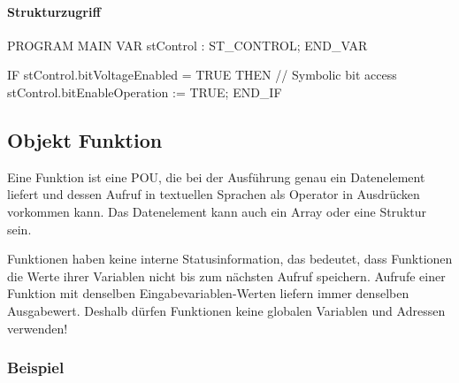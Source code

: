 \documentclass[
  10pt,
  a4paper,
]{article}
\let\oldparagraph\paragraph
\renewcommand{\paragraph}[1]{\oldparagraph{#1}\mbox{}}
\newenvironment{Shaded}{}{}
\newcommand{\NormalTok}[1]{\textcolor[rgb]{0.14,0.16,0.18}{#1}}
\numberwithin{equation}{section}
\let\paragraph\oldparagraph
\renewcommand{\paragraph}[1]{\oldparagraph{#1}\mbox{}\par}
\begin{document}
\hypertarget{strukturzugriff}{%
\paragraph{Strukturzugriff}\label{strukturzugriff}}

\begin{Shaded}
\begin{Highlighting}[]
\NormalTok{PROGRAM MAIN}
\NormalTok{VAR}
\NormalTok{    stControl : ST\_CONTROL;}
\NormalTok{END\_VAR}

\NormalTok{IF stControl.bitVoltageEnabled = TRUE THEN}
\NormalTok{    // Symbolic bit access}
\NormalTok{    stControl.bitEnableOperation := TRUE;}
\NormalTok{END\_IF}
\end{Highlighting}
\end{Shaded}

\hypertarget{objekt-funktion}{%
\subsection{Objekt Funktion}\label{objekt-funktion}}

Eine Funktion ist eine POU, die bei der Ausführung genau ein
Datenelement liefert und dessen Aufruf in textuellen Sprachen als
Operator in Ausdrücken vorkommen kann. Das Datenelement kann auch ein
Array oder eine Struktur sein.

\begin{tcolorbox}[enhanced jigsaw, leftrule=.75mm, colbacktitle=quarto-callout-important-color!10!white, title=\textcolor{quarto-callout-important-color}{\faExclamation}\hspace{0.5em}{keine interne Statusinformation}, coltitle=black, bottomrule=.15mm, breakable, colback=white, colframe=quarto-callout-important-color-frame, toptitle=1mm, arc=.35mm, bottomtitle=1mm, left=2mm, rightrule=.15mm, toprule=.15mm, opacityback=0, titlerule=0mm, opacitybacktitle=0.6]

Funktionen haben keine interne Statusinformation, das bedeutet, dass
Funktionen die Werte ihrer Variablen nicht bis zum nächsten Aufruf
speichern. Aufrufe einer Funktion mit denselben Eingabevariablen-Werten
liefern immer denselben Ausgabewert. Deshalb dürfen Funktionen keine
globalen Variablen und Adressen verwenden!

\end{tcolorbox}

\hypertarget{beispiel-1}{%
\subsubsection{Beispiel}\label{beispiel-1}}
\end{document}
